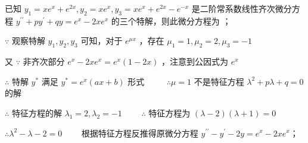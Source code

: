 \documentclass{exam-zh}
\begin{document}
\begin{question}
    已知 $y_1 = xe^x + e^{2x}, y_2 = xe^x, y_3 = xe^x + e^{2x} - e^{-x}$ 是二阶常系数线性齐次微分方程
    $y^{\prime\prime} + py^{\prime} + qy = e^x - 2xe^x$ 的三个特解，则此微分方程为
    \fillin[$y^{\prime\prime} - y^{\prime} - 2y = e^x - 2xe^x$]；
\end{question}
\begin{solution}
    $\because$ 观察特解 $y_1, y_2, y_3$ 可知，对于 $e^{\mu x}$ ，存在 $\mu_1 = 1, \mu_2 = 2, \mu_3 = -1$

    又 $\because$ 非齐次部分 $e^x - 2xe^x = e^x(1 - 2x)$ ，注意到公因式为 $e^x$

    $\therefore$ 特解 $y^*$ 满足 $y^* = e^x(ax + b)$ 形式 $\qquad$
    $\therefore \mu = 1$ 不是特征方程 $\lambda^2 + p\lambda + q = 0$ 的解

    $\therefore$ 特征方程的解 $\lambda_1 = 2, \lambda_2 = -1 \qquad$
    $\therefore$ 特征方程为 $(\lambda - 2)(\lambda + 1) = 0$

    $\therefore \lambda^2 - \lambda - 2 = 0 \qquad$
    根据特征方程反推得原微分方程 $y^{\prime\prime} - y^{\prime} - 2y = e^x - 2xe^x$；
\end{solution}
\end{document}
